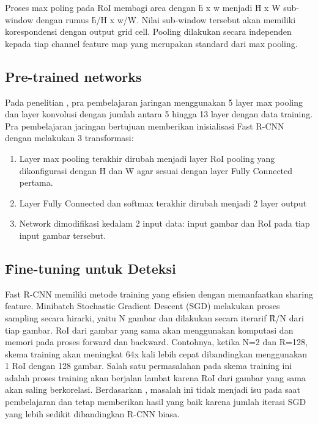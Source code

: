 Proses max poling pada RoI membagi area dengan \f{h x w} menjadi \f{H x W} sub-window dengan rumus \f{h/H x w/W}. Nilai sub-window tersebut akan memiliki korespondensi dengan output grid cell. Pooling dilakukan secara independen kepada tiap channel feature map yang merupakan standard dari max pooling.

\subsection{Pre-trained networks}
Pada penelitian \cite{fast_rcnn}, pra pembelajaran jaringan menggunakan 5 layer max pooling dan layer konvolusi dengan jumlah antara 5 hingga 13 layer dengan data training. Pra pembelajaran jaringan bertujuan memberikan inisialisasi Fast R-CNN dengan melakukan 3 transformasi:
\begin{enumerate}
	\item Layer max pooling terakhir dirubah menjadi layer RoI pooling yang dikonfigurasi dengan \f{H} dan \f{W} agar sesuai dengan layer Fully Connected pertama.
	\item Layer Fully Connected dan softmax terakhir dirubah menjadi 2 layer output
	\item Network dimodifikasi kedalam 2 input data: input gambar dan RoI pada tiap input gambar tersebut.
\end{enumerate}

\subsection{\f{Fine-tuning} untuk Deteksi}
Fast R-CNN memiliki metode training yang efisien dengan memanfaatkan sharing feature. Minibatch Stochastic Gradient Descent (SGD) melakukan proses sampling secara hirarki, yaitu N gambar dan dilakukan secara iterarif \f{R/N} dari tiap gambar. RoI dari gambar yang sama akan menggunakan komputasi dan memori pada proses forward dan backward. Contohnya, ketika N=2 dan R=128, skema training akan meningkat 64x kali lebih cepat dibandingkan menggunakan 1 RoI dengan 128 gambar. Salah satu permasalahan pada skema training ini adalah proses training akan berjalan lambat karena RoI dari gambar yang sama akan saling berkorelasi. Berdasarkan \cite{fast_rcnn}, masalah ini tidak menjadi isu pada saat pembelajaran dan tetap memberikan hasil yang baik karena jumlah iterasi SGD yang lebih sedikit dibandingkan R-CNN biasa.

